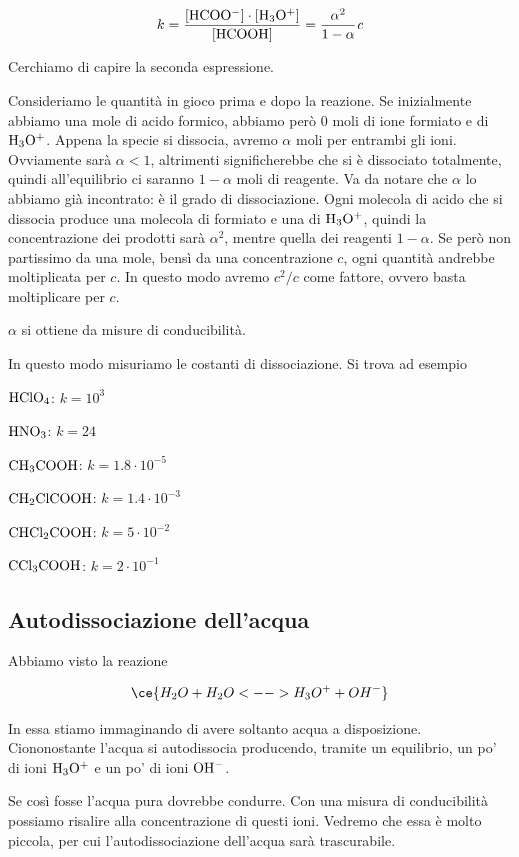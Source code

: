 $$k= \rm{\frac{[HCOO^-]\cdot[H_3O^+]}{[HCOOH]}} = \frac{\alpha^2}{1- \alpha}\textit{c}$$

Cerchiamo di capire la seconda espressione.

Consideriamo le quantità in gioco prima e dopo la reazione. Se inizialmente abbiamo una mole di acido formico, abbiamo però 0 moli di ione formiato e di $\rm H_3O^+$. Appena la specie si dissocia, avremo $\alpha$ moli per entrambi gli ioni. Ovviamente sarà $\alpha<1$, altrimenti significherebbe che si è dissociato totalmente, quindi all'equilibrio ci saranno $1-\alpha$ moli di reagente. Va da notare che $\alpha$ lo abbiamo già incontrato: è il grado di dissociazione. Ogni molecola di acido che si dissocia produce una molecola di formiato e una di $\rm H_3O^+$, quindi la concentrazione dei prodotti sarà $\alpha^2$, mentre quella dei reagenti $1-\alpha$. Se però non partissimo da una mole, bensì da una concentrazione $c$, ogni quantità andrebbe moltiplicata per $c$. In questo modo avremo $c^2/c$ come fattore, ovvero basta moltiplicare per $c$.

$\alpha$ si ottiene da misure di conducibilità.

In questo modo misuriamo le costanti di dissociazione. Si trova ad esempio

$\rm HClO_4$: $k=10^3$

$\rm HNO_3$: $k=24$

$\rm CH_3COOH$: $k=1.8 \cdot 10^{-5}$

$\rm CH_2ClCOOH$: $k=1.4 \cdot 10^{-3}$

$\rm CHCl_2COOH$: $k=5 \cdot 10^{-2}$

$\rm CCl_3COOH$: $k=2 \cdot 10^{-1}$


\subsection{Autodissociazione dell'acqua}
Abbiamo visto la reazione

$$\ce{H_2O + H_2O <--> H_3O^+ + OH^-}$$

In essa stiamo immaginando di avere soltanto acqua a disposizione. Ciononostante l'acqua si autodissocia producendo, tramite un equilibrio, un po' di ioni $\rm H_3O^+$ e un po' di ioni $\rm OH^-$.

Se così fosse l'acqua pura dovrebbe condurre. Con una misura di conducibilità possiamo risalire alla concentrazione di questi ioni. Vedremo che essa è molto piccola, per cui l'autodissociazione dell'acqua sarà trascurabile.

